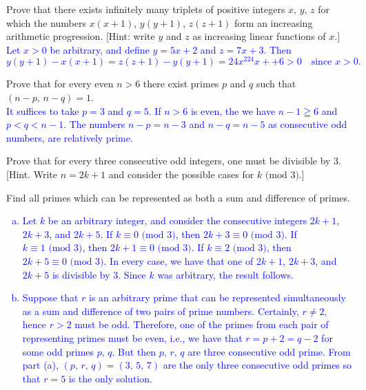 \documentclass[a4paper,11pt]{article}
\theoremstyle{mythm}
\theoremstyle{mydef}
\newcommand{\blue}[1]{\textcolor{blue}{#1}}
\renewcommand{\pmod}[1]{\text{ (mod $#1$)}}
\begin{document}
 Prove that there exists infinitely many triplets of
positive integers $x,\,y,\,z$ for which the numbers $x(x+1)$, $y(y+1)$, $z(z+1)$
form an increasing arithmetic progression. [Hint: write $y$ and $z$ as
increasing linear functions of $x$.] \\

\blue{Let $x>0$ be arbitrary, and define $y=5x+2$ and $z=7x+3$. Then
  \[
    y(y+1)-x(x+1) = z(z+1)-y(y+1) = 24x^224x++6 > 0\quad\mbox{since $x>0$.}
  \]
}

 Prove that for every even $n>6$ there exist primes
$p$ and $q$ such that $(n-p,\,n-q)=1$. \\

\blue{It suffices to take $p=3$ and $q=5$. If $n>6$ is even, the we have $n-1
  \geqq 6$ and $p < q < n-1$. The numbers $n-p=n-3$ and $n-q=n-5$ as consecutive
odd numbers, are relatively prime.} \\

\begin{enumerate*}[{\bf (a)}]
\item Prove that for every three consecutive odd integers, one must be divisible
  by 3. [Hint. Write $n=2k+1$ and consider the possible cases for $k \pmod{3}$.]
\item Find all primes which can be represented as both a sum and difference of
  primes.
\end{enumerate*}

\blue{
  \begin{enumerate}[(a)]
  \item Let $k$ be an arbitrary integer, and consider the consecutive integers
    $2k+1$, $2k+3$, and $2k+5$. If $k \equiv 0 \pmod{3}$, then $2k+3 \equiv 0
    \pmod{3}$. If $k \equiv 1\pmod{3}$, then $2k+1 \equiv 0\pmod{3}$. If $k
    \equiv 2\pmod{3}$, then $2k+5 \equiv 0\pmod{3}$. In every case, we have that
    one of $2k+1$, $2k+3$, and $2k+5$ is divisible by 3. Since $k$ was
    arbitrary, the result follows.
  \item Suppose that $r$ is an arbitrary prime that can be represented
    simultaneously as a sum and difference of two pairs of prime numbers.
    Certainly, $r \neq 2$, hence $r>2$ must be odd. Therefore, one of the primes
    from each pair of representing primes must be even, i.e., we have that
    $r=p+2=q-2$ for some odd primes $p,\,q$. But then $p,\,r,\,q$ are three
    consecutive odd prime. From part (a), $(p,\,r,\,q)=(3,\,5,\,7)$ are the only
    three consecutive odd primes so that $r=5$ is the only solution. \\
  \end{enumerate}
}
\end{document}
